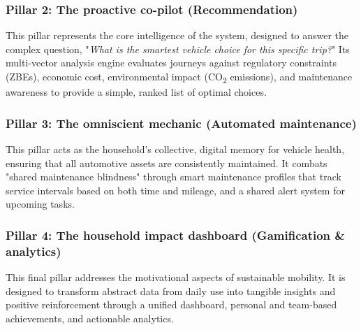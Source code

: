 \subsubsection{Pillar 2: The proactive co-pilot (Recommendation)}
This pillar represents the core intelligence of the system, designed to answer the complex question, "\textit{What is the smartest vehicle choice for this specific trip?}" Its multi-vector analysis engine evaluates journeys against regulatory constraints (ZBEs), economic cost, environmental impact (CO\textsubscript{2} emissions), and maintenance awareness to provide a simple, ranked list of optimal choices.

\subsubsection{Pillar 3: The omniscient mechanic (Automated maintenance)}
This pillar acts as the household's collective, digital memory for vehicle health, ensuring that all automotive assets are consistently maintained. It combats "shared maintenance blindness" through smart maintenance profiles that track service intervals based on both time and mileage, and a shared alert system for upcoming tasks.

\subsubsection{Pillar 4: The household impact dashboard (Gamification \& analytics)}
This final pillar addresses the motivational aspects of sustainable mobility. It is designed to transform abstract data from daily use into tangible insights and positive reinforcement through a unified dashboard, personal and team-based achievements, and actionable analytics.

